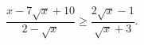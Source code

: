 \begin{ex}[type=inequality]
	\begin{condition}
		$\dfrac{x - 7\sqrt{x} + 10}{2 - \sqrt{x}}\geqslant\dfrac{2\sqrt{x} - 1}{\sqrt{x} + 3}.$
	\end{condition}
\end{ex}